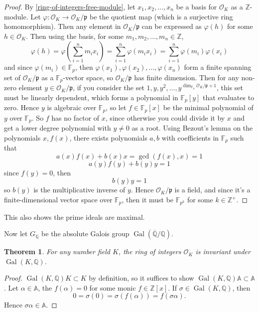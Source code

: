 \documentclass{article}
\newtheorem{theorem}{Theorem}[section]
\theoremstyle{definition}
\theoremstyle{definition}
\theoremstyle{definition}
\newcommand{\gal}{\operatorname{Gal}}
\newcommand{\Gal}{\operatorname{Gal}}
\newcommand{\Z}{\mathbb{Z}}
\newcommand{\Q}{\mathbb{Q}}
\newcommand{\A}{\mathbb{A}}
\begin{document}
\begin{proof}
By \ref{ring-of-integers-free-module}, let $x_1,x_2,\dots,x_n$ be a basis for $\mathcal O_K$ as a $\mathbb Z$-module. Let $\varphi:\mathcal O_K\rightarrow\mathcal O_K/\mathfrak p$ be the quotient map (which is a surjective ring homomorphism). Then any element in $\mathcal O_K/\mathfrak p$ can be expressed as $\varphi(h)$ for some $h\in\mathcal O_K$. Then using the basis, for some $m_1,m_2,\dots,m_n\in\mathbb Z$,
$$\varphi(h)=\varphi(\sum_{i=1}^nm_ix_i)=\sum_{i=1}^n\varphi(m_ix_i)=\sum_{i=1}^n\varphi(m_i)\varphi(x_i)$$
and since $\varphi(m_i)\in\mathbb F_p$, then $\varphi(x_1),\varphi(x_2),\dots,\varphi(x_n)$ form a finite spanning set of $\mathcal O_K/\mathfrak p$ as a $\mathbb F_p$-vector space, so $\mathcal O_K/\mathfrak p$ has finite dimension. Then for any non-zero element $y\in\mathcal O_K/\mathfrak p$, if you consider the set ${1,y,y^2,\dots,y^{\operatorname{dim}_{\mathbb F_p}\mathcal O_K/\mathfrak p+1}}$, this set must be linearly dependent, which forms a polynomial in $\mathbb F_p[y]$ that evaluates to zero. Hence $y$ is algebraic over $\mathbb F_p$, so let $f\in\mathbb F_p[x]$ be the minimal polynomial of $y$ over $\mathbb F_p$. So $f$ has no factor of $x$, since otherwise you could divide it by $x$ and get a lower degree polynomial with $y\neq0$ as a root. Using Bezout's lemma on the polynomials $x,f(x)$, there exists polynomials $a,b$ with coefficients in $\mathbb F_p$ such that
$$a(x)f(x)+b(x)x=\gcd(f(x),x)=1$$
$$a(y)f(y)+b(y)y=1$$
since $f(y)=0$, then
$$b(y)y=1$$
so $b(y)$ is the multiplicative inverse of $y$. Hence $\mathcal O_K/\mathfrak p$ is a field, and since it's a finite-dimensional vector space over $\mathbb F_p$, then it must be $\mathbb F_{p^k}$ for some $k\in\mathbb Z^+$.
\end{proof}
This also shows the prime ideals are maximal.

Now let $G_{\Q}$ be the absolute Galois group $\operatorname{Gal}(\overline{\mathbb{Q}}/\mathbb{Q})$.


\begin{theorem}
    For any number field $K$, the ring of integers $\mathcal O_K$ is invariant under $\gal(K,\Q)$.
\end{theorem}

\begin{proof} $\Gal(K,\Q)K\subset K$ by definition, so it suffices to show $\gal(K,\Q)\mathbb{A}\subset\mathbb{A}$. Let $\alpha\in\A$, the $f(\alpha)=0$ for some monic $f\in\Z[x]$. If $\sigma\in\gal(K,\Q)$, then 
$$0=\sigma(0)=\sigma(f(\alpha))=f(\sigma\alpha).$$
Hence $\sigma\alpha\in\A$.
\end{proof}
\end{document}
